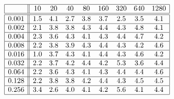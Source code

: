 \[
\begin{array}{|c||cccccccc|}
\hline 
& 10 & 20 & 40 & 80 & 160 & 320 & 640 & 1280\\
\hline \hline 
0.001 & 1.5 & 4.1 & 2.7 & 3.8 & 3.7 & 2.5 & 3.5 & 4.1 \\ \hline 
0.002 & 2.1 & 3.8 & 3.8 & 4.3 & 4.4 & 4.3 & 4.8 & 4.1 \\ \hline 
0.004 & 2.3 & 3.6 & 4.3 & 4.1 & 4.3 & 4.4 & 4.7 & 4.2 \\ \hline 
0.008 & 2.2 & 3.8 & 3.9 & 4.3 & 4.4 & 4.3 & 4.2 & 4.6 \\ \hline 
0.016 & 1.0 & 3.7 & 4.3 & 4.1 & 4.4 & 4.3 & 4.6 & 4.2 \\ \hline 
0.032 & 2.2 & 3.7 & 4.2 & 4.4 & 4.2 & 5.3 & 3.6 & 4.4 \\ \hline 
0.064 & 2.2 & 3.6 & 4.3 & 4.1 & 4.3 & 4.4 & 4.4 & 4.6 \\ \hline 
0.128 & 2.2 & 3.8 & 3.8 & 4.2 & 4.4 & 4.3 & 4.5 & 4.5 \\ \hline 
0.256 & 3.4 & 2.6 & 4.0 & 4.1 & 4.2 & 5.6 & 4.1 & 4.4 \\ \hline 
\end{array}
\]

